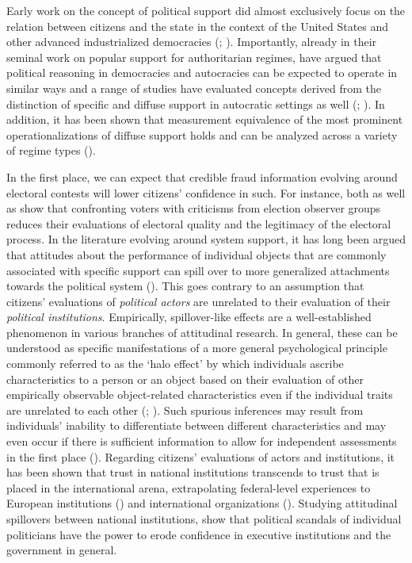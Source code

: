 \documentclass[11pt, ngerman,english,a4]{article}
\begin{document}
Early work on the concept of political support did almost exclusively focus on the relation between citizens and the state in the context of the United States and other advanced industrialized democracies (\citealt{Easton1965, Easton1975}; \citealt{Citrin1974}). Importantly, already in their seminal work on popular support for authoritarian regimes, \citet{Geddes1989} have argued that political reasoning in democracies and autocracies can be expected to operate in similar ways and a range of studies have evaluated concepts derived from the distinction of specific and diffuse support in autocratic settings as well (\citealt{Reuter2019}; \citealt{Frye2019}). In addition, it has been shown that measurement equivalence of the most prominent operationalizations of diffuse support holds and can be analyzed across a variety of regime types (\citealt{Schneider2017}). 

In the first place, we can expect that credible fraud information evolving around electoral contests will lower citizens’ confidence in such. For instance, both \citet{Robertson2017} as well as \citet{Bush2018} show that confronting voters with criticisms from election observer groups reduces their evaluations of electoral quality and the legitimacy of the electoral process. In the literature evolving around system support, it has long been argued that attitudes about the performance of individual objects that are commonly associated with specific support can spill over to more generalized attachments towards the political system (\citealt{Bowler2004}). This goes contrary to an assumption that citizens’ evaluations of \textit{political actors} are unrelated to their evaluation of their \textit{political institutions}. Empirically, spillover-like effects are a well-established phenomenon in various branches of attitudinal research. In general, these can be understood as specific manifestations of a more general psychological principle commonly referred to as the `halo effect’ by which individuals ascribe characteristics to a person or an object based on their evaluation of other empirically observable object-related characteristics even if the individual traits are unrelated to each other (\citealt{Thorndike1920}; \citealt{Palmer2016}). Such spurious inferences may result from individuals’ inability to differentiate between different characteristics and may even occur if there is sufficient information to allow for independent assessments in the first place (\citealt{Nisbett1977}). Regarding citizens’ evaluations of actors and institutions, it has been shown that trust in national institutions transcends to trust that is placed in the international arena, extrapolating federal-level experiences to European institutions (\citealt{Torcal2019}) and international organizations (\citealt{Dellmuth2015}). Studying attitudinal spillovers between national institutions, \citet{Bowler2004} show that political scandals of individual politicians have the power to erode confidence in executive institutions and the government in general. 
\end{document}
